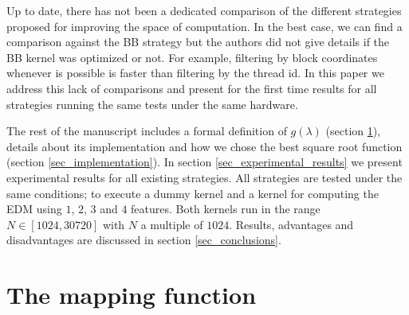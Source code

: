 \documentclass[conference]{IEEEtran}
\begin{document}
Up to date, there has not been a dedicated comparison of the different strategies proposed for improving the space of computation. In the best case, we can find a comparison against the BB strategy 
\cite{AvrilGA12} but the authors did not give details if the BB kernel was optimized or not. For example, 
filtering by block coordinates whenever is possible is faster than filtering by the thread id. 
In this paper we address this lack of comparisons and present for the first time results for all strategies running the same tests under the same hardware.

The rest of the manuscript includes a formal definition of $g(\lambda)$ (section \ref{sec_td_strategy}), details about its implementation and how we chose the best square root function 
(section \ref{sec_implementation}). In section \ref{sec_experimental_results} we present experimental results for 
all existing strategies. All strategies are tested under the same conditions; to execute a dummy kernel and a kernel for computing 
the EDM using $1$, $2$, $3$ and $4$ features. Both kernels run in the range $N \in [1024, 30720]$ with $N$ a multiple of $1024$. 
Results, advantages and disadvantages are discussed in section \ref{sec_conclusions}.










\section{The mapping function}
\label{sec_td_strategy}
\end{document}
